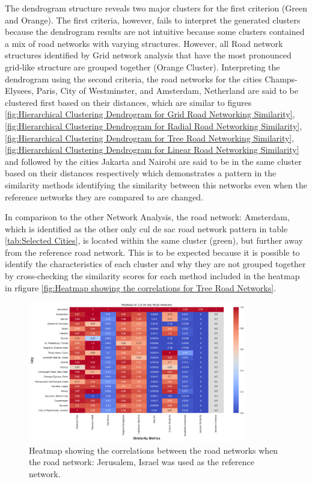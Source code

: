 The dendrogram structure reveals two major clusters for the first criterion (Green and Orange). The first criteria, however, fails to interpret the generated clusters because the dendrogram results are not intuitive because some clusters contained a mix of road networks with varying structures. However, all Road network structures identified by Grid network analysis that have the most pronounced grid-like structure are grouped together (Orange Cluster). Interpreting the dendrogram using the second criteria, the road networks for the cities Champs-Elysees, Paris, City of Westminster, and Amsterdam, Netherland are said to be clustered first based on their distances, which are similar to figures \ref{fig:Hierarchical Clustering Dendrogram for Grid Road Networking Similarity}, \ref{fig:Hierarchical Clustering Dendrogram for Radial Road Networking Similarity}, \ref{fig:Hierarchical Clustering Dendrogram for Tree Road Networking Similarity}, \ref{fig:Hierarchical Clustering Dendrogram for Linear Road Networking Similarity} and  followed by the cities Jakarta and Nairobi are said to be in the same cluster based on their distances  respectively which demonstrates a pattern in the similarity methods identifying the similarity between this networks even when the reference networks they are compared to are changed.

In comparison to the other Network Analysis, the road network: Amsterdam, which is identified as the other only cul de sac road network pattern in table  \ref{tab:Selected Cities}, is located within the same cluster (green), but further away from the reference road network. This is to be expected because it is possible to identify the characteristics of each cluster and why they are not grouped together by cross-checking the similarity scores for each method included in the heatmap in rfigure \ref{fig:Heatmap showing the correlations for Tree Road Networks}.


\begin{figure}[!ht]
\centering
\includegraphics[width=0.85\textwidth,center]{picture/Cul De Sac/culdesacheatmap.png}
\caption[Heatmap showing the correlations for Cul De Sac Road Networks]{Heatmap showing the correlations between the road networks when the road network: Jerusalem, Israel was used as the reference network.}
\label{fig:Heatmap showing the correlations for Cul De Sac Road Networks}
\end{figure}

